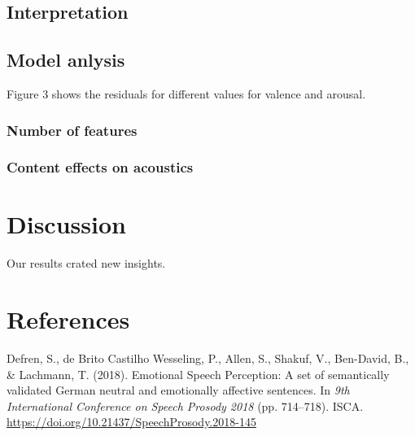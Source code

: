 \documentclass[english,man]{apa6}
\begin{document}
\hypertarget{interpretation}{%
\subsection{Interpretation}\label{interpretation}}

\hypertarget{model-anlysis}{%
\subsection{Model anlysis}\label{model-anlysis}}

Figure 3 shows the residuals for different values for valence and arousal.

\hypertarget{number-of-features-1}{%
\subsubsection{Number of features}\label{number-of-features-1}}

\hypertarget{content-effects-on-acoustics-1}{%
\subsubsection{Content effects on acoustics}\label{content-effects-on-acoustics-1}}

\hypertarget{discussion}{%
\section{Discussion}\label{discussion}}

Our results crated new insights.

\newpage

\hypertarget{references}{%
\section{References}\label{references}}

\begingroup
\setlength{\parindent}{-0.5in}
\setlength{\leftskip}{0.5in}

\hypertarget{refs}{}
\leavevmode\hypertarget{ref-defrenEmotionalSpeechPerception2018}{}%
Defren, S., de Brito Castilho Wesseling, P., Allen, S., Shakuf, V., Ben-David, B., \& Lachmann, T. (2018). Emotional Speech Perception: A set of semantically validated German neutral and emotionally affective sentences. In \emph{9th International Conference on Speech Prosody 2018} (pp. 714--718). ISCA. \url{https://doi.org/10.21437/SpeechProsody.2018-145}

\endgroup
\end{document}
